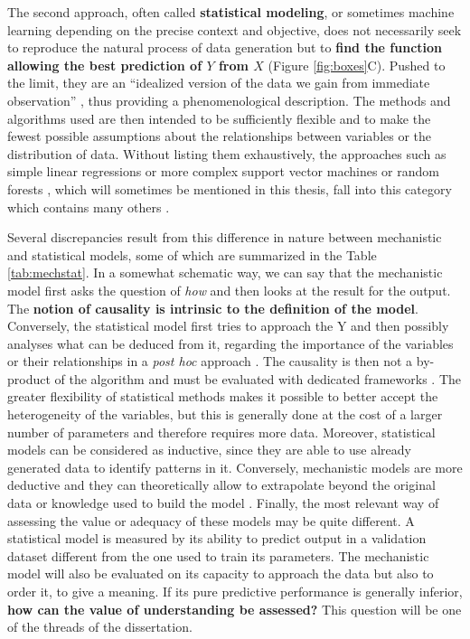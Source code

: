 \documentclass[a4paper,12pt,twoside,onecolumn,openright,final,oldfontcommands]{memoir}
\begin{document}
The second approach, often called \textbf{statistical modeling}, or
sometimes machine learning depending on the precise context and
objective, does not necessarily seek to reproduce the natural process of
data generation but to \textbf{find the function allowing the best
prediction of \(Y\) from \(X\)} (Figure \ref{fig:boxes}C). Pushed to the
limit, they are an ``idealized version of the data we gain from
immediate observation'' \citep{frigg2020models}, thus providing a
phenomenological description. The methods and algorithms used are then
intended to be sufficiently flexible and to make the fewest possible
assumptions about the relationships between variables or the
distribution of data. Without listing them exhaustively, the approaches
such as simple linear regressions or more complex support vector
machines \citep{cortes1995support} or random forests
\citep{breiman2001random}, which will sometimes be mentioned in this
thesis, fall into this category which contains many others
\citep{hastie2009elements}.

Several discrepancies result from this difference in nature between
mechanistic and statistical models, some of which are summarized in the
Table \ref{tab:mechstat}. In a somewhat schematic way, we can say that
the mechanistic model first asks the question of \emph{how} and then
looks at the result for the output. The \textbf{notion of causality is
intrinsic to the definition of the model}. Conversely, the statistical
model first tries to approach the Y and then possibly analyses what can
be deduced from it, regarding the importance of the variables or their
relationships in a \emph{post hoc} approach
\citep{ishwaran2007variable, manica2019toward}. The causality is then
not a by-product of the algorithm and must be evaluated with dedicated
frameworks \citep{hernan2020causal}. The greater flexibility of
statistical methods makes it possible to better accept the heterogeneity
of the variables, but this is generally done at the cost of a larger
number of parameters and therefore requires more data. Moreover,
statistical models can be considered as inductive, since they are able
to use already generated data to identify patterns in it. Conversely,
mechanistic models are more deductive and they can theoretically allow
to extrapolate beyond the original data or knowledge used to build the
model \citep{baker2018mechanistic}. Finally, the most relevant way of
assessing the value or adequacy of these models may be quite different.
A statistical model is measured by its ability to predict output in a
validation dataset different from the one used to train its parameters.
The mechanistic model will also be evaluated on its capacity to approach
the data but also to order it, to give a meaning. If its pure predictive
performance is generally inferior, \textbf{how can the value of
understanding be assessed?} This question will be one of the threads of
the dissertation.
\end{document}
